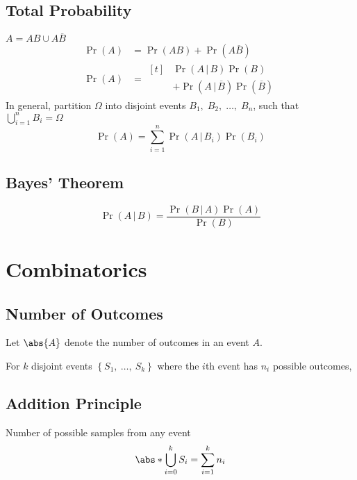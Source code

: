 \documentclass{article}
\begin{document}
\begin{multicols}{3}
    \subsection{Total Probability}
    \(A = AB \cup A\overline{B}\)
    \begin{align*}
        \Pr{\left( A \right)} & = \Pr{\left( AB \right)} + \Pr{\left( A\overline{B} \right)} \\
        \Pr{\left( A \right)} & = \begin{aligned}[t]
                                      &\Pr{\left( A \,\vert\, B \right)}\Pr{\left( B \right)} \\
                                      &+ \Pr{\left( A \,\vert\, \overline{B} \right)}\Pr{\left( \overline{B} \right)}
                                  \end{aligned}
    \end{align*}
    In general, partition \(\Omega\) into disjoint events \(B_1,\; B_2,\; \dots,\; B_n\),
    such that \(\bigcup_{i=1}^n B_i = \Omega\)
    \begin{equation*}
        \Pr{\left( A \right)} = \sum_{i = 1}^n \Pr{\left( A \,\vert\, B_i \right)}\Pr{\left( B_i \right)}
    \end{equation*}
    \subsection{Bayes' Theorem}
    \begin{equation*}
        \Pr{\left( A \,\vert\, B \right)} = \frac{\Pr{\left( B \,\vert\, A \right)}\Pr{\left( A \right)}}{\Pr{\left( B \right)}}
    \end{equation*}
    \section{Combinatorics}
    \subsection{Number of Outcomes}
    Let \(\abs{A}\) denote the number of outcomes in an event \(A\).

    For \(k\) disjoint events \({\left\{ S_1,\:\ldots,\:S_k \right\}}\)
    where the \(i\)th event has \(n_i\) possible outcomes,
    \subsection{Addition Principle}
    Number of possible samples from any event
    \begin{equation*}
        \abs*{\bigcup_{i = 0}^{k} S_i} = \sum_{i = 1}^k n_i
    \end{equation*}

\end{multicols}
\end{document}
